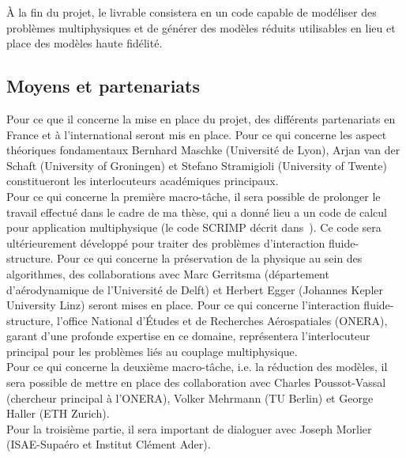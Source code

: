 \documentclass[french]{article}
\begin{document}
\`A la fin du projet, le livrable consistera en un code capable de modéliser des problèmes multiphysiques et de générer des modèles réduits utilisables en lieu et place des modèles haute fidélité.

\subsection{Moyens et partenariats}
Pour ce que il concerne la mise en place du projet, des différents partenariats en France et \`a l'international seront mis en place. Pour ce qui concerne les aspect théoriques fondamentaux Bernhard Maschke (Universit\'e de Lyon), Arjan van der Schaft (University of Groningen) et Stefano Stramigioli (University of Twente) constitueront les interlocuteurs académiques principaux. \\

Pour ce qui concerne la première macro-tâche, il sera possible de prolonger le travail effectué dans le cadre de ma thèse, qui a donn\'e lieu a un code de calcul pour application multiphysique (le code SCRIMP décrit dans~\cite{brugnoli2021num}). Ce code sera ultérieurement développé pour traiter des problèmes d'interaction fluide-structure. Pour ce qui concerne la préservation de la physique au sein des algorithmes, des collaborations avec Marc Gerritsma (département d'aérodynamique de l'Universit\'e de Delft) et Herbert Egger (Johannes Kepler University Linz) seront mises en place. Pour ce qui concerne l'interaction fluide-structure, l'office National d'Études et de Recherches Aérospatiales (ONERA), garant d'une profonde expertise en ce domaine, représentera l'interlocuteur principal pour les problèmes liés au couplage multiphysique. 
\\


Pour ce qui concerne la deuxième macro-tâche, i.e. la réduction des modèles, il sera possible de mettre en place des collaboration avec Charles Poussot-Vassal (chercheur principal \`a l'ONERA),  Volker Mehrmann (TU Berlin) et George Haller (ETH Zurich). \\

Pour la troisième partie, il sera important de dialoguer avec Joseph Morlier (ISAE-Supa\'ero et Institut Clément Ader).
\end{document}
